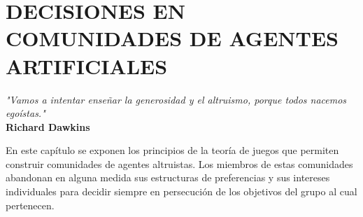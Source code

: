 

\chapter{DECISIONES EN COMUNIDADES DE AGENTES ARTIFICIALES}

\begin{flushright}
\textit{"Vamos a intentar enseñar la generosidad y el altruismo, porque todos nacemos egoístas."}\\
\textbf{Richard Dawkins}
\end{flushright}

En este capítulo se exponen los principios de la teoría de juegos que permiten construir comunidades de agentes altruistas.  Los miembros de estas comunidades abandonan en alguna medida sus estructuras de preferencias y sus intereses individuales para decidir siempre en persecución  de los objetivos del grupo al cual pertenecen.

